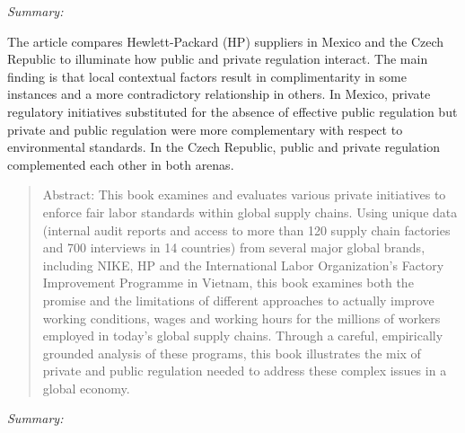 \documentclass[
  12pt,
]{article}
\begin{document}
\emph{Summary:}

The article compares Hewlett-Packard (HP) suppliers in Mexico and the
Czech Republic to illuminate how public and private regulation interact.
The main finding is that local contextual factors result in
complimentarity in some instances and a more contradictory relationship
in others. In Mexico, private regulatory initiatives substituted for the
absence of effective public regulation but private and public regulation
were more complementary with respect to environmental standards. In the
Czech Republic, public and private regulation complemented each other in
both arenas.

\bigbreak


\begin{quote}
Abstract: 
This book examines and evaluates various private initiatives to enforce fair labor standards within global supply chains. Using unique data (internal audit reports and access to more than 120 supply chain factories and 700 interviews in 14 countries) from several major global brands, including NIKE, HP and the International Labor Organization's Factory Improvement Programme in Vietnam, this book examines both the promise and the limitations of different approaches to actually improve working conditions, wages and working hours for the millions of workers employed in today's global supply chains. Through a careful, empirically grounded analysis of these programs, this book illustrates the mix of private and public regulation needed to address these complex issues in a global economy.
\end{quote}

\emph{Summary:}

\printbibliography
\end{document}
